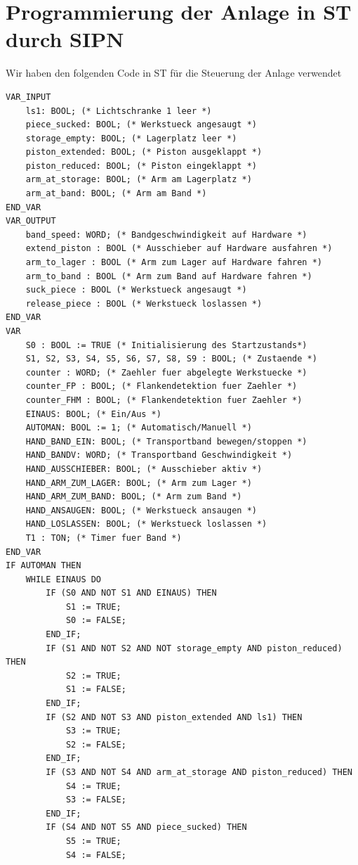 \documentclass{report}
\begin{document}
\section{Programmierung der Anlage in ST durch SIPN}

Wir haben den folgenden Code in ST für die Steuerung der Anlage verwendet

\begin{lstlisting}
VAR_INPUT
    ls1: BOOL; (* Lichtschranke 1 leer *)
    piece_sucked: BOOL; (* Werkstueck angesaugt *)
    storage_empty: BOOL; (* Lagerplatz leer *)
    piston_extended: BOOL; (* Piston ausgeklappt *)
    piston_reduced: BOOL; (* Piston eingeklappt *)
    arm_at_storage: BOOL; (* Arm am Lagerplatz *)
    arm_at_band: BOOL; (* Arm am Band *)
END_VAR
VAR_OUTPUT
    band_speed: WORD; (* Bandgeschwindigkeit auf Hardware *)
    extend_piston : BOOL (* Ausschieber auf Hardware ausfahren *)
    arm_to_lager : BOOL (* Arm zum Lager auf Hardware fahren *)
    arm_to_band : BOOL (* Arm zum Band auf Hardware fahren *)
    suck_piece : BOOL (* Werkstueck angesaugt *)
    release_piece : BOOL (* Werkstueck loslassen *)
END_VAR
VAR
    S0 : BOOL := TRUE (* Initialisierung des Startzustands*)
    S1, S2, S3, S4, S5, S6, S7, S8, S9 : BOOL; (* Zustaende *)
    counter : WORD; (* Zaehler fuer abgelegte Werkstuecke *)
    counter_FP : BOOL; (* Flankendetektion fuer Zaehler *)
    counter_FHM : BOOL; (* Flankendetektion fuer Zaehler *)
    EINAUS: BOOL; (* Ein/Aus *)
    AUTOMAN: BOOL := 1; (* Automatisch/Manuell *)
    HAND_BAND_EIN: BOOL; (* Transportband bewegen/stoppen *)
    HAND_BANDV: WORD; (* Transportband Geschwindigkeit *)
    HAND_AUSSCHIEBER: BOOL; (* Ausschieber aktiv *)
    HAND_ARM_ZUM_LAGER: BOOL; (* Arm zum Lager *)
    HAND_ARM_ZUM_BAND: BOOL; (* Arm zum Band *)
    HAND_ANSAUGEN: BOOL; (* Werkstueck ansaugen *)
    HAND_LOSLASSEN: BOOL; (* Werkstueck loslassen *)
    T1 : TON; (* Timer fuer Band *)
END_VAR
IF AUTOMAN THEN
    WHILE EINAUS DO
        IF (S0 AND NOT S1 AND EINAUS) THEN
            S1 := TRUE;
            S0 := FALSE;
        END_IF;
        IF (S1 AND NOT S2 AND NOT storage_empty AND piston_reduced) THEN
            S2 := TRUE;
            S1 := FALSE;
        END_IF;
        IF (S2 AND NOT S3 AND piston_extended AND ls1) THEN
            S3 := TRUE;
            S2 := FALSE;
        END_IF;
        IF (S3 AND NOT S4 AND arm_at_storage AND piston_reduced) THEN
            S4 := TRUE;
            S3 := FALSE;
        END_IF;
        IF (S4 AND NOT S5 AND piece_sucked) THEN
            S5 := TRUE;
            S4 := FALSE;

\end{lstlisting}
\end{document}
